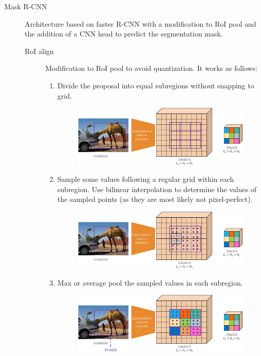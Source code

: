 \begin{description}
    \item[Mask R-CNN] 
        Architecture based on faster R-CNN with a modification to RoI pool and the addition of a CNN head to predict the segmentation mask.

        \begin{description}
            \item[RoI align] 
                Modification to RoI pool to avoid quantization. It works as follows:
                \begin{enumerate}
                    \item Divide the proposal into equal subregions without snapping to grid.
                    \begin{figure}[H]
                        \centering
                        \includegraphics[width=0.7\linewidth]{./img/_roi_align1.jpg}
                    \end{figure}
                    \item Sample some values following a regular grid within each subregion. Use bilinear interpolation to determine the values of the sampled points (as they are most likely not pixel-perfect).
                    \begin{figure}[H]
                        \centering
                        \includegraphics[width=0.7\linewidth]{./img/_roi_align2.jpg}
                    \end{figure}
                    \item Max or average pool the sampled values in each subregion.
                    \begin{figure}[H]
                        \centering
                        \includegraphics[width=0.7\linewidth]{./img/_roi_align3.jpg}
                    \end{figure}
                \end{enumerate}


\end{description}
\end{description}
